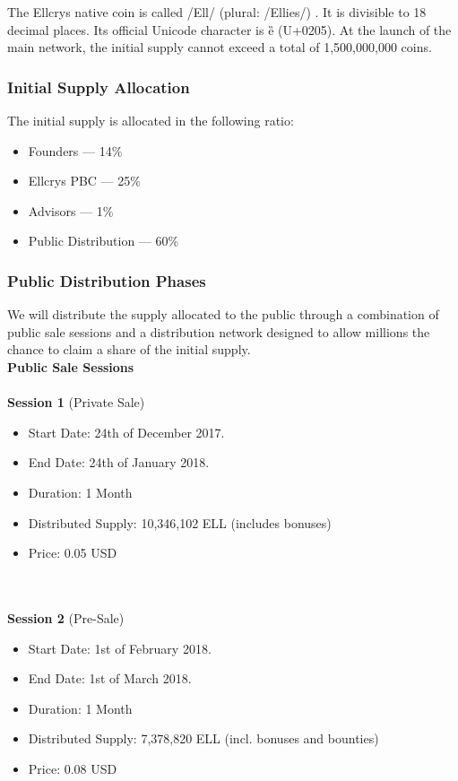 The Ellcrys native coin is called /Ell/ (plural: /Ellies/) . It is divisible to 18 decimal places. Its official Unicode character is ȅ (U+0205). At the launch of the main network, the initial supply cannot exceed a total of 1,500,000,000 coins.

\newpage
\subsubsection{Initial Supply Allocation}
The initial supply is allocated in the following ratio:
\begin{itemize}
	\item Founders — 14\%
	\item Ellcrys PBC — 25\%
	\item Advisors — 1\%
	\item Public Distribution — 60\%
\end{itemize}

\subsubsection{Public Distribution Phases}
We will distribute the supply allocated to the public through a combination of public sale sessions and a distribution network designed to allow millions the chance to claim a share of the initial supply.\\

\noindent
\textbf{Public Sale Sessions} \\\\
\textbf{Session 1} (Private Sale)
\begin{itemize}
	\item Start Date: 24th of December 2017.
	\item End Date: 24th of January 2018.
	\item Duration: 1 Month
	\item Distributed Supply: 10,346,102 ELL (includes bonuses)
	\item Price: 0.05 USD
\end{itemize} \\

\noindent
\\\textbf{Session 2} (Pre-Sale)

\begin{itemize}
	\item Start Date: 1st of February 2018.
	\item End Date: 1st of March 2018.
	\item Duration: 1 Month
	\item Distributed Supply: 7,378,820 ELL (incl. bonuses and bounties)
	\item Price: 0.08 USD
\end{itemize} \\

